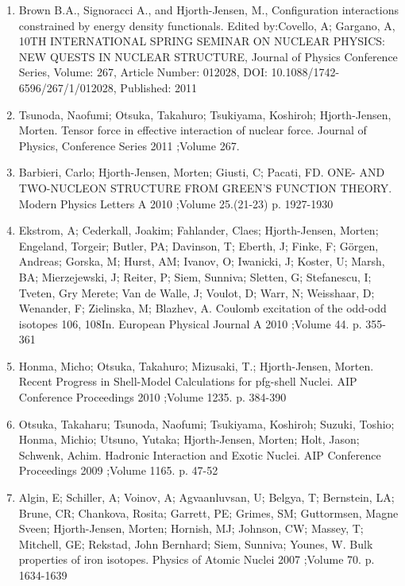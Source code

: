 \documentclass[a4wide,10pt]{article}
\begin{document}
\begin{enumerate}
\item Brown B.A., Signoracci A., and Hjorth-Jensen, M., Configuration interactions constrained by energy density functionals. Edited by:Covello, A; Gargano, A, 10TH INTERNATIONAL SPRING SEMINAR ON NUCLEAR PHYSICS: NEW QUESTS IN NUCLEAR STRUCTURE, Journal of Physics Conference Series, Volume: 267, Article Number: 012028, DOI: 10.1088/1742-6596/267/1/012028, Published: 2011

\item Tsunoda, Naofumi; Otsuka, Takahuro; Tsukiyama, Koshiroh; Hjorth-Jensen, Morten. Tensor force in effective interaction of nuclear force. Journal of Physics, Conference Series 2011 ;Volume 267.

\item Barbieri, Carlo; Hjorth-Jensen, Morten; Giusti, C; Pacati, FD. ONE- AND TWO-NUCLEON STRUCTURE FROM GREEN'S FUNCTION THEORY. Modern Physics Letters A 2010 ;Volume 25.(21-23) p. 1927-1930

\item Ekstrom, A; Cederkall, Joakim; Fahlander, Claes; Hjorth-Jensen, Morten; Engeland, Torgeir; Butler, PA; Davinson, T; Eberth, J; Finke, F; Görgen, Andreas; Gorska, M; Hurst, AM; Ivanov, O; Iwanicki, J; Koster, U; Marsh, BA; Mierzejewski, J; Reiter, P; Siem, Sunniva; Sletten, G; Stefanescu, I; Tveten, Gry Merete; Van de Walle, J; Voulot, D; Warr, N; Weisshaar, D; Wenander, F; Zielinska, M; Blazhev, A.  Coulomb excitation of the odd-odd isotopes 106, 108In. European Physical Journal A 2010 ;Volume 44. p. 355-361

\item Honma, Micho; Otsuka, Takahuro; Mizusaki, T.; Hjorth-Jensen, Morten.  Recent Progress in Shell-Model Calculations for pfg-shell Nuclei. AIP Conference Proceedings 2010 ;Volume 1235. p. 384-390

\item Otsuka, Takaharu; Tsunoda, Naofumi; Tsukiyama, Koshiroh; Suzuki, Toshio; Honma, Michio; Utsuno, Yutaka; Hjorth-Jensen, Morten; Holt, Jason; Schwenk, Achim.  Hadronic Interaction and Exotic Nuclei. AIP Conference Proceedings 2009 ;Volume 1165. p. 47-52

\item Algin, E; Schiller, A; Voinov, A; Agvaanluvsan, U; Belgya, T; Bernstein, LA; Brune, CR; Chankova, Rosita; Garrett, PE; Grimes, SM; Guttormsen, Magne Sveen; Hjorth-Jensen, Morten; Hornish, MJ; Johnson, CW; Massey, T; Mitchell, GE; Rekstad, John Bernhard; Siem, Sunniva; Younes, W.  Bulk properties of iron isotopes. Physics of Atomic Nuclei 2007 ;Volume 70. p. 1634-1639


\end{enumerate}
\end{document}

